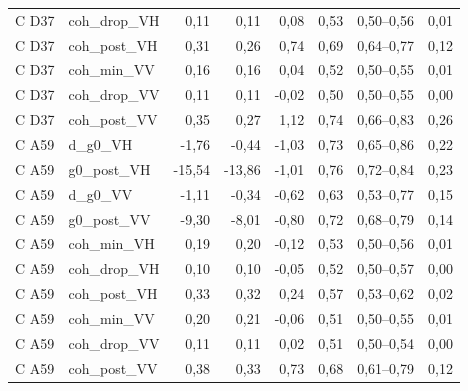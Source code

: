 \begin{tabular}{llrrrrcr}
C D37 & coh\_drop\_VH & 0{,}11 & 0{,}11 & 0{,}08 & 0{,}53 & 0{,}50--0{,}56 & 0{,}01 \\
C D37 & coh\_post\_VH & 0{,}31 & 0{,}26 & 0{,}74 & 0{,}69 & 0{,}64--0{,}77 & 0{,}12 \\
C D37 & coh\_min\_VV & 0{,}16 & 0{,}16 & 0{,}04 & 0{,}52 & 0{,}50--0{,}55 & 0{,}01 \\
C D37 & coh\_drop\_VV & 0{,}11 & 0{,}11 & -0{,}02 & 0{,}50 & 0{,}50--0{,}55 & 0{,}00 \\
C D37 & coh\_post\_VV & 0{,}35 & 0{,}27 & 1{,}12 & 0{,}74 & 0{,}66--0{,}83 & 0{,}26 \\
C A59 & d\_g0\_VH & -1{,}76 & -0{,}44 & -1{,}03 & 0{,}73 & 0{,}65--0{,}86 & 0{,}22 \\
C A59 & g0\_post\_VH & -15{,}54 & -13{,}86 & -1{,}01 & 0{,}76 & 0{,}72--0{,}84 & 0{,}23 \\
C A59 & d\_g0\_VV & -1{,}11 & -0{,}34 & -0{,}62 & 0{,}63 & 0{,}53--0{,}77 & 0{,}15 \\
C A59 & g0\_post\_VV & -9{,}30 & -8{,}01 & -0{,}80 & 0{,}72 & 0{,}68--0{,}79 & 0{,}14 \\
C A59 & coh\_min\_VH & 0{,}19 & 0{,}20 & -0{,}12 & 0{,}53 & 0{,}50--0{,}56 & 0{,}01 \\
C A59 & coh\_drop\_VH & 0{,}10 & 0{,}10 & -0{,}05 & 0{,}52 & 0{,}50--0{,}57 & 0{,}00 \\
C A59 & coh\_post\_VH & 0{,}33 & 0{,}32 & 0{,}24 & 0{,}57 & 0{,}53--0{,}62 & 0{,}02 \\
C A59 & coh\_min\_VV & 0{,}20 & 0{,}21 & -0{,}06 & 0{,}51 & 0{,}50--0{,}55 & 0{,}01 \\
C A59 & coh\_drop\_VV & 0{,}11 & 0{,}11 & 0{,}02 & 0{,}51 & 0{,}50--0{,}54 & 0{,}00 \\
C A59 & coh\_post\_VV & 0{,}38 & 0{,}33 & 0{,}73 & 0{,}68 & 0{,}61--0{,}79 & 0{,}12 \\
\bottomrule
\end{tabular}
